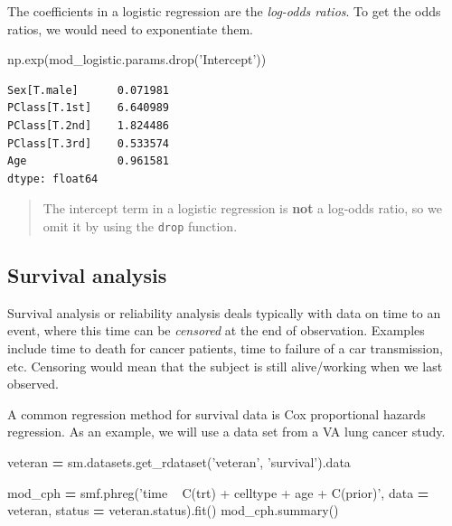 \documentclass[
  letterpaper,
]{scrbook}
\newenvironment{Shaded}{\begin{snugshade}}{\end{snugshade}}
\newcommand{\NormalTok}[1]{#1}
\newcommand{\OperatorTok}[1]{\textcolor[rgb]{0.81,0.36,0.00}{\textbf{#1}}}
\newcommand{\StringTok}[1]{\textcolor[rgb]{0.31,0.60,0.02}{#1}}
\begin{document}
The coefficients in a logistic regression are the \emph{log-odds ratios}. To get the odds ratios, we would need to exponentiate them.

\begin{Shaded}
\begin{Highlighting}[]
\NormalTok{np.exp(mod_logistic.params.drop(}\StringTok{'Intercept'}\NormalTok{))}
\end{Highlighting}
\end{Shaded}

\begin{verbatim}
Sex[T.male]      0.071981
PClass[T.1st]    6.640989
PClass[T.2nd]    1.824486
PClass[T.3rd]    0.533574
Age              0.961581
dtype: float64
\end{verbatim}

\begin{quote}
The intercept term in a logistic regression is \textbf{not} a log-odds ratio, so we omit it by using the \texttt{drop} function.
\end{quote}

\hypertarget{survival-analysis}{%
\subsection{Survival analysis}\label{survival-analysis}}

Survival analysis or reliability analysis deals typically with data on
time to an event, where this time can be \emph{censored} at the end of observation. Examples include time to death for cancer patients, time to failure of a car transmission, etc. Censoring would mean that the subject is still alive/working when we last observed.

A common regression method for survival data is Cox proportional hazards regression. As an example, we will use a data set from a VA lung cancer study.

\begin{Shaded}
\begin{Highlighting}[]
\NormalTok{veteran }\OperatorTok{=}\NormalTok{ sm.datasets.get_rdataset(}\StringTok{'veteran'}\NormalTok{, }\StringTok{'survival'}\NormalTok{).data}

\NormalTok{mod_cph }\OperatorTok{=}\NormalTok{ smf.phreg(}\StringTok{'time ~ C(trt) + celltype + age + C(prior)'}\NormalTok{,}
\NormalTok{  data }\OperatorTok{=}\NormalTok{ veteran, status }\OperatorTok{=}\NormalTok{ veteran.status).fit()}
\NormalTok{mod_cph.summary()}
\end{Highlighting}
\end{Shaded}
\end{document}
